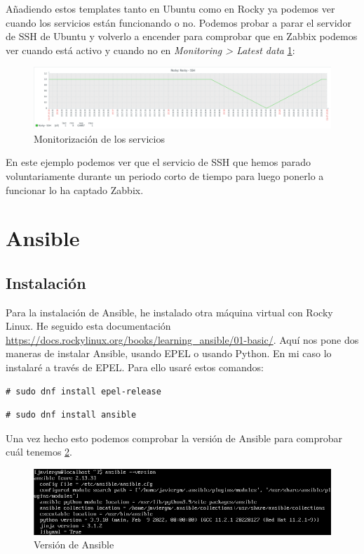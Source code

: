 Añadiendo estos templates tanto en Ubuntu como en Rocky ya podemos ver cuando los servicios están funcionando o no. Podemos probar a parar el servidor de SSH de Ubuntu y volverlo a encender para comprobar que en Zabbix podemos ver cuando está activo y cuando no en \textit{Monitoring > Latest data} \ref{fig:monit-servicios}:

\begin{figure}[H]
  \centering
  \includegraphics[scale=0.4]{Captura18}
  \caption{Monitorización de los servicios}
  \label{fig:monit-servicios}
\end{figure}

En este ejemplo podemos ver que el servicio de SSH que hemos parado voluntariamente durante un periodo corto de tiempo para luego ponerlo a funcionar lo ha captado Zabbix.

\newpage

\section{Ansible}

\subsection{Instalación}
Para la instalación de Ansible, he instalado otra máquina virtual con Rocky Linux. He seguido esta documentación \url{https://docs.rockylinux.org/books/learning_ansible/01-basic/}. Aquí nos pone dos maneras de instalar Ansible, usando EPEL o usando Python. En mi caso lo instalaré a través de EPEL. Para ello usaré estos comandos:

\begin{lstlisting}
# sudo dnf install epel-release
\end{lstlisting}

\begin{lstlisting}
# sudo dnf install ansible
\end{lstlisting}

Una vez hecho esto podemos comprobar la versión de Ansible para comprobar cuál tenemos \ref{fig:ansible-version}.

\begin{figure}[H]
  \centering
  \includegraphics[scale=0.8]{Captura19}
  \caption{Versión de Ansible}
  \label{fig:ansible-version}
\end{figure}

